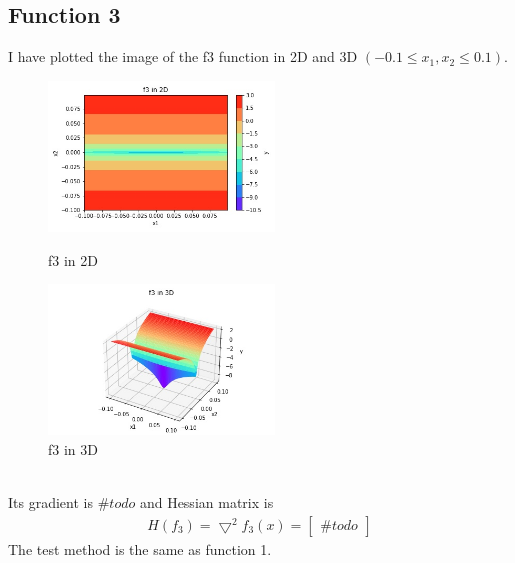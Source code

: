 \documentclass[a4paper,12pt]{article}
\begin{document}
\subsection{Function 3}
I have plotted the image of the f3 function in 2D and 3D $(-0.1 \leq x_1, x_2 \leq 0.1)$.\\
\begin{figure}[htbp]
\centering
\begin{minipage}[t]{0.48\textwidth}
\centering
\includegraphics[width=6cm]{f3_2d.jpg}
\caption{f3 in 2D}
\end{minipage}
\begin{minipage}[t]{0.48\textwidth}
\centering
\includegraphics[width=6cm]{f3_3d.jpg}
\caption{f3 in 3D}
\end{minipage}
\end{figure}\\
Its gradient is $\#todo$ and Hessian matrix is 
\begin{align*}
H(f_3) = \bigtriangledown^2 f_3(x) = 
\begin{bmatrix}
\#todo
\end{bmatrix}
\end{align*}
The test method is the same as function 1.
\end{document}
